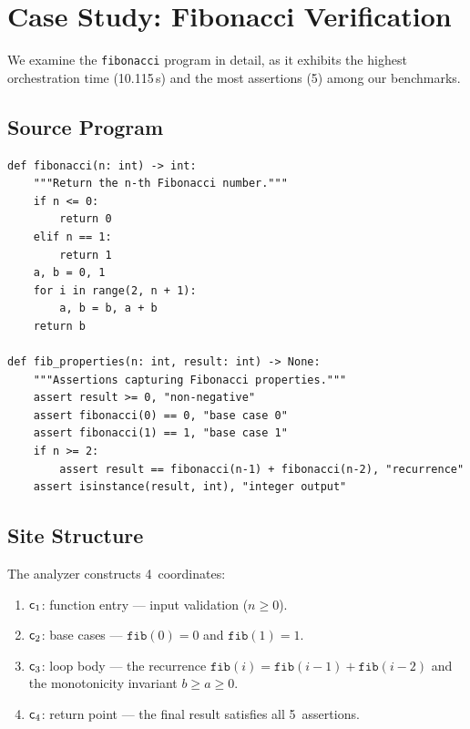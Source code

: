 \documentclass[11pt]{article}
\begin{document}
\section{Case Study: Fibonacci Verification}\label{sec:case-fibonacci}

We examine the \texttt{fibonacci} program in detail, as it exhibits the
highest orchestration time (10.115\,s) and the most assertions (5) among
our benchmarks.

\subsection{Source Program}

\begin{lstlisting}[style=jugeo-python]
def fibonacci(n: int) -> int:
    """Return the n-th Fibonacci number."""
    if n <= 0:
        return 0
    elif n == 1:
        return 1
    a, b = 0, 1
    for i in range(2, n + 1):
        a, b = b, a + b
    return b

def fib_properties(n: int, result: int) -> None:
    """Assertions capturing Fibonacci properties."""
    assert result >= 0, "non-negative"
    assert fibonacci(0) == 0, "base case 0"
    assert fibonacci(1) == 1, "base case 1"
    if n >= 2:
        assert result == fibonacci(n-1) + fibonacci(n-2), "recurrence"
    assert isinstance(result, int), "integer output"
\end{lstlisting}

\subsection{Site Structure}

The analyzer constructs 4~coordinates:
\begin{enumerate}[noitemsep]
  \item $\mathsf{c}_1$: function entry --- input validation ($n \ge 0$).
  \item $\mathsf{c}_2$: base cases --- $\texttt{fib}(0) = 0$ and
        $\texttt{fib}(1) = 1$.
  \item $\mathsf{c}_3$: loop body --- the recurrence
        $\texttt{fib}(i) = \texttt{fib}(i-1) + \texttt{fib}(i-2)$
        and the monotonicity invariant $b \ge a \ge 0$.
  \item $\mathsf{c}_4$: return point --- the final result satisfies all
        5~assertions.
\end{enumerate}
\end{document}
